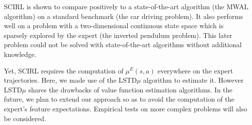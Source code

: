 \documentclass{article}
\begin{document}
SCIRL is shown to compare positively to a state-of-the-art algorithm
(the MWAL algorithm) on a standard benchmark (the car driving
problem). It also performs well on a problem with a two-dimensional
continuous state space which is sparsely explored by the expert (the
inverted pendulum problem). This later problem could not be solved
with state-of-the-art algorithms without additional knowledge.

Yet, SCIRL requires the computation of $\mu^E(s,a)$ everywhere on
the expert trajectories. Here, we made use of the LSTD$\mu$
algorithm to estimate it. However LSTD$\mu$ shares the drawbacks of
value function estimation algorithms. In the future, we plan to
extend our approach so as to avoid the computation of the expert's
feature expectations. Empirical tests on more complex problems will
also be considered.



\end{document}
